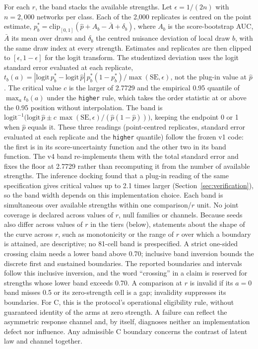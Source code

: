 For each $r$, the band stacks the available strengths. %
Let $\epsilon=1/(2n)$ with $n=2{,}000$ networks per class. %
Each of the 2,000 replicates is centred on the point estimate, $p^*_b=\mathrm{clip}_{[0,1]}(\hat p+A_b-\bar A+\delta_b)$, where $A_b$ is the score-bootstrap AUC, $\bar A$ its mean over draws and $\delta_b$ the centred nuisance deviation of local draw $b$, with the same draw index at every strength. %
Estimates and replicates are then clipped to $[\epsilon,1-\epsilon]$ for the logit transform. %
The studentized deviation uses the logit standard error evaluated at each replicate, $t_b(a)=|\mathrm{logit}\,p^*_b-\mathrm{logit}\,\hat p|\,p^*_b(1-p^*_b)/\max(\mathrm{SE},\epsilon)$, not the plug-in value at $\hat p$. %
The critical value $c$ is the larger of 2.7729 and the empirical 0.95 quantile of $\max_a t_b(a)$ under the \texttt{higher} rule, which takes the order statistic at or above the 0.95 position without interpolation. %
The band is $\mathrm{logit}^{-1}\bigl(\mathrm{logit}\,\hat p\pm c\,\max(\mathrm{SE},\epsilon)/(\hat p(1-\hat p))\bigr)$, keeping the endpoint 0 or 1 when $\hat p$ equals it. %
These three readings (point-centred replicates, standard error evaluated at each replicate and the \texttt{higher} quantile) follow the frozen v1 code: the first is in its score-uncertainty function and the other two in its band function. The v4 band re-implements them with the total standard error and fixes the floor at 2.7729 rather than recomputing it from the number of available strengths. %
The inference docking found that a plug-in reading of the same specification gives critical values up to 2.1 times larger (Section~\ref{sec:verification}), so the band width depends on this implementation choice. %
Each band is simultaneous over available strengths within one comparison/$r$ unit. No joint coverage is declared across values of $r$, null families or channels. %
Because seeds also differ across values of $r$ in the tiers (below), statements about the shape of the curve across $r$, such as monotonicity or the range of $r$ over which a boundary is attained, are descriptive; no 81-cell band is prespecified. %
A strict one-sided crossing claim needs a lower band above 0.70; inclusive band inversion bounds the discrete first and sustained boundaries. %
The reported boundaries and intervals follow this inclusive inversion, and the word ``crossing'' in a claim is reserved for strengths whose lower band exceeds 0.70. %
A comparison at $r$ is invalid if its $a=0$ band misses 0.5 or its zero-strength cell is a gap; invalidity suppresses its boundaries. %
For C, this is the protocol's operational eligibility rule, without guaranteed identity of the arms at zero strength. A failure can reflect the asymmetric response channel and, by itself, diagnoses neither an implementation defect nor influence. Any admissible C boundary concerns the contrast of latent law and channel together. %

